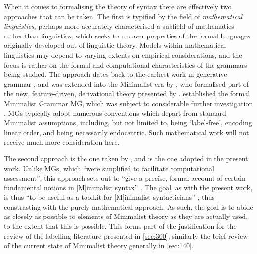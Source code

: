 When it comes to formalising the theory of syntax there are effectively two approaches that can be taken. The first is typified by the field of \textit{mathematical linguistics}, perhaps more accurately characterised a subfield of mathematics rather than linguistics, which seeks to uncover properties of the formal languages originally developed out of linguistic theory. Models within mathematical linguistics may depend to varying extents on empirical considerations, and the focus is rather on the formal and computational characteristics of the grammars being studied. The approach dates back to the earliest work in generative grammar \parencite{ChomskyN_1956, ChomskyN.MillerGA_1963, MillerGA.ChomskyN_1963}, and was extended into the Minimalist era by \textcite{StablerE_1997}, who formalised part of the new, feature-driven, derivational theory presented by \textcite{ChomskyN_1995}. \textcite{StablerE_1997} established the formal Minimalist Grammar {MG}, which was subject to considerable further investigation \parencite[e.g.][]{GrafT_2013}. MGs typically adopt numerous conventions which depart from standard Minimalist assumptions, including, but not limited to, being `label-free', encoding linear order, and being necessarily endocentric. Such mathematical work will not receive much more consideration here.

The second approach is the one taken by \textcite{CollinsC.StablerE_2016}, and is the one adopted in the present work. Unlike MGs, which ``were simplified to facilitate computational assessment'', this approach sets out to ``give a precise, formal account of certain fundamental notions in [M]inimalist syntax'' \parencite[43]{CollinsC.StablerE_2016}. The goal, as with the present work, is thus ``to be useful as a toolkit for [M]inimalist syntacticians'' \parencite[43]{CollinsC.StablerE_2016}, thus constrasting with the purely mathematical approach. As such, the goal is to abide as closely as possible to elements of Minimalist theory as they are actually used, to the extent that this is possible. This forms part of the justification for the review of the labelling literature presented in \autoref{sec:300}, similarly the brief review of the current state of Minimalist theory generally in \autoref{sec:140}.

